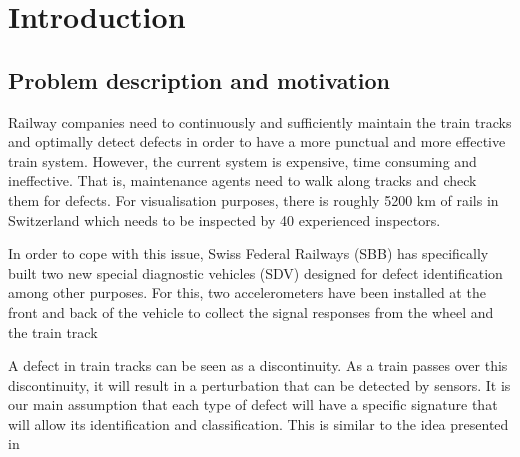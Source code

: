 



%



\maketitle

%
{
  \hypersetup{linkcolor=black}
  \tableofcontents
   
}
\newpage
\chapter{Introduction}
\section{Problem description and motivation} 
Railway companies need to continuously and sufficiently maintain the train tracks and optimally detect defects in order to have a more punctual and more effective train system. However, the current system is expensive, time consuming and ineffective. That is, maintenance agents need to walk along tracks and check them for defects. For visualisation purposes, there is roughly 5200 km of rails in Switzerland which needs to be inspected by 40 experienced inspectors.


In order to cope with this issue, Swiss Federal Railways (SBB) has specifically built two new special diagnostic vehicles (SDV) designed for defect identification among other purposes. For this, two accelerometers have been installed at the front and back of the vehicle to collect the signal responses from the wheel and the train track

A defect in train tracks can be seen as a discontinuity. As a train passes over this discontinuity, it will result in a perturbation that can be detected by sensors. It is our main assumption that each type of defect will have a specific signature that will allow its identification and classification. This is similar to the idea presented in 

